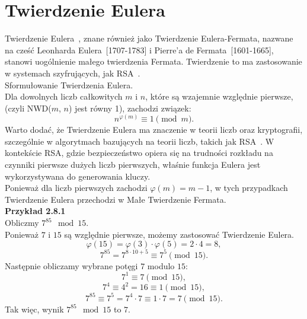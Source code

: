\documentclass{SGGW-thesis}
\begin{document}
	\section{Twierdzenie Eulera}
	Twierdzenie Eulera~\cite{ajakubiec}\cite{r28modulo}, znane również jako Twierdzenie Eulera-Fermata, nazwane na cześć Leonharda Eulera~[1707-1783] i Pierre'a de Fermata~[1601-1665], stanowi uogólnienie małego twierdzenia Fermata. Twierdzenie to ma zastosowanie w systemach szyfrujących, jak RSA~\cite{rsa}.
	\vspace{1em}
	\\
	\noindent Sformułowanie Twierdzenia Eulera.
	\vspace{1em}
	\\
	Dla dowolnych liczb całkowitych \( m \) i \( n \), które są wzajemnie względnie pierwsze, 
	\\
	(czyli NWD(\( m \), \( n \)) jest równy 1), zachodzi związek:
	\begin{equation}
		n^{\varphi(m)} \equiv 1 \pmod{m}.
	\end{equation}
	Warto dodać, że Twierdzenie Eulera ma znaczenie w teorii liczb oraz kryptografii, szczególnie w algorytmach bazujących na teorii liczb, takich jak RSA~\cite{rsa}. W kontekście RSA, gdzie bezpieczeństwo opiera się na trudności rozkładu na czynniki pierwsze dużych liczb pierwszych, właśnie funkcja Eulera jest wykorzystywana do generowania kluczy.
	\\
	Ponieważ dla liczb pierwszych zachodzi \( \varphi(m) = m - 1 \), w tych przypadkach Twierdzenie Eulera przechodzi w Małe Twierdzenie Fermata.
	\vspace{1em}
	\\
	\noindent \textbf{Przykład 2.8.1}
	\vspace{1em}
	\\
	Obliczmy \( 7^{85} \mod 15 \).
	\\
	Ponieważ \( 7 \) i \( 15 \) są względnie pierwsze, możemy zastosować Twierdzenie Eulera.
	\[ \varphi(15) = \varphi(3) \cdot \varphi(5) = 2 \cdot 4 = 8, \]
	\[ 7^{85} = 7^{8 \cdot 10 + 5} \equiv 7^5 \pmod{15}. \]
	Następnie obliczamy wybrane potęgi \( 7 \) modulo \( 15 \):
	\[ 7^1 \equiv 7 \pmod{15}, \]
	\[ 7^4 \equiv 4^2 = 16 \equiv 1 \pmod{15}, \]
	\[ 7^{85} \equiv 7^5 = 7^4 \cdot 7 \equiv 1 \cdot 7 = 7 \pmod{15}. \]
	Tak więc, wynik \( 7^{85} \mod 15 \) to \( 7 \).
	\newpage
	
\end{document}
